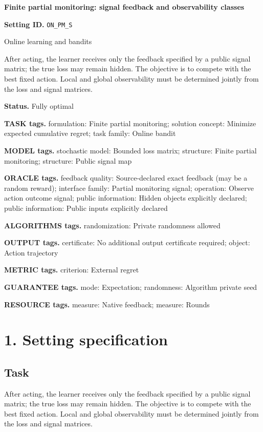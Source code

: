 \documentclass[10pt,a4paper]{article}
\begin{document}
\raggedright

{\LARGE\bfseries\sffamily\color{AtlasNavy} Finite partial monitoring: signal feedback and observability classes\par}\vspace{5pt}
\textbf{Setting ID.} \texttt{ON\_\allowbreak{}PM\_\allowbreak{}S}

Online learning and bandits

After acting, the learner receives only the feedback specified by a public signal matrix; the true loss may remain hidden. The objective is to compete with the best fixed action. Local and global observability must be determined jointly from the loss and signal matrices.

\textbf{Status.} Fully optimal

\textbf{TASK tags.} formulation: Finite partial monitoring; solution concept: Minimize expected cumulative regret; task family: Online bandit

\textbf{MODEL tags.} stochastic model: Bounded loss matrix; structure: Finite partial monitoring; structure: Public signal map

\textbf{ORACLE tags.} feedback quality: Source-declared exact feedback (may be a random reward); interface family: Partial monitoring signal; operation: Observe action outcome signal; public information: Hidden objects explicitly declared; public information: Public inputs explicitly declared

\textbf{ALGORITHMS tags.} randomization: Private randomness allowed

\textbf{OUTPUT tags.} certificate: No additional output certificate required; object: Action trajectory

\textbf{METRIC tags.} criterion: External regret

\textbf{GUARANTEE tags.} mode: Expectation; randomness: Algorithm private seed

\textbf{RESOURCE tags.} measure: Native feedback; measure: Rounds

\section{1. Setting specification}
\subsection{Task}
After acting, the learner receives only the feedback specified by a public signal matrix; the true loss may remain hidden. The objective is to compete with the best fixed action. Local and global observability must be determined jointly from the loss and signal matrices.
\end{document}
